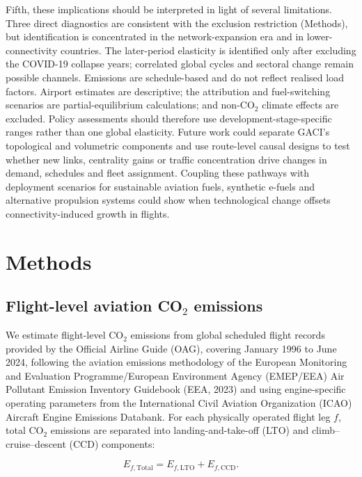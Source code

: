 \documentclass[12pt]{extarticle}
\begin{document}
Fifth, these implications should be interpreted in light of several limitations. Three direct diagnostics are consistent with the exclusion restriction (Methods), but identification is concentrated in the network-expansion era and in lower-connectivity countries. The later-period elasticity is identified only after excluding the COVID-19 collapse years; correlated global cycles and sectoral change remain possible channels. Emissions are schedule-based and do not reflect realised load factors. Airport estimates are descriptive; the attribution and fuel-switching scenarios are partial-equilibrium calculations; and non-CO$_2$ climate effects are excluded. Policy assessments should therefore use development-stage-specific ranges rather than one global elasticity. Future work could separate GACI's topological and volumetric components and use route-level causal designs to test whether new links, centrality gains or traffic concentration drive changes in demand, schedules and fleet assignment. Coupling these pathways with deployment scenarios for sustainable aviation fuels, synthetic e-fuels and alternative propulsion systems could show when technological change offsets connectivity-induced growth in flights.

\section*{Methods}
\subsection*{Flight-level aviation CO$_2$ emissions}

We estimate flight-level CO$_2$ emissions from global scheduled flight records provided by the Official Airline Guide (OAG), covering January 1996 to June 2024, following the aviation emissions methodology of the European Monitoring and Evaluation Programme/European Environment Agency (EMEP/EEA) Air Pollutant Emission Inventory Guidebook (EEA, 2023) and using engine-specific operating parameters from the International Civil Aviation Organization (ICAO) Aircraft Engine Emissions Databank. For each physically operated flight leg $f$, total CO$_2$ emissions are separated into landing-and-take-off (LTO) and climb--cruise--descent (CCD) components:

\begin{equation}
E_{f,\mathrm{Total}}
=
E_{f,\mathrm{LTO}}
+
E_{f,\mathrm{CCD}} .
\label{eq:nature_1}
\end{equation}
\end{document}

